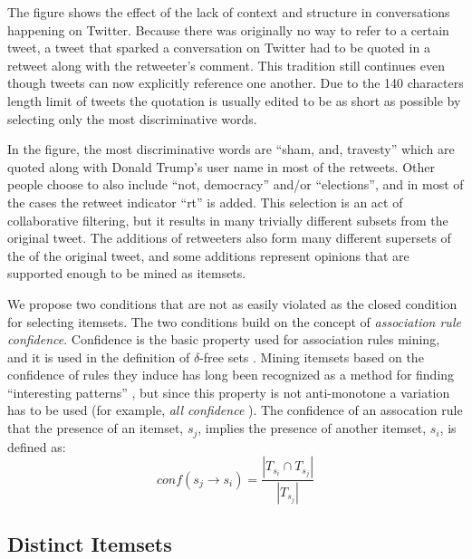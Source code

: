 \documentclass{sig-alternate}
\begin{document}
The figure shows the effect of the lack of context and structure in
conversations happening on Twitter.
Because there was originally no way to refer to a certain tweet,
a tweet that sparked a conversation on Twitter had to be quoted in a retweet
along with the retweeter's comment.
This tradition still continues even though tweets can now explicitly reference
one another. 
Due to the 140 characters length limit of tweets the quotation is usually 
edited to be as short as possible by selecting only the most discriminative
words. 

In the figure, the most discriminative words are ``sham, and, travesty''
which are quoted along with Donald Trump's user name in most of the retweets.
Other people choose to also include ``not, democracy'' and/or ``elections'',
and in most of the cases the retweet indicator ``rt'' is added. 
This selection is an act of collaborative filtering,
but it results in many trivially different subsets from the original tweet.
The additions of retweeters also form many different supersets of the of the
original tweet, and some additions represent opinions that are supported
enough to be mined as itemsets. 

We propose two conditions that are not as easily violated as the closed
condition for selecting itemsets.
The two conditions build on the concept of \emph{association rule confidence}.
Confidence is the basic property used for association rules mining,
and it is used in the definition of $\delta$-free sets \cite{boulicaut2003free}.
Mining itemsets based on the confidence of rules they induce has long been
recognized as a method for finding
``interesting patterns'' \cite{cohen2001finding},
but since this property is not anti-monotone a variation has to be used
(for example, \emph{all confidence} \cite{kim2004ccmine}).
The confidence of an assocation rule that the presence of an itemset,
$s_{j}$, implies the presence of another itemset, $s_i$, is  defined as:
\begin{equation}\label{eq:conf}conf(s_j \rightarrow s_i) = \frac{|T_{s_i} \cap T_{s_j}|}{|T_{s_j}|}\end{equation}


\subsection{Distinct Itemsets}
\end{document}
